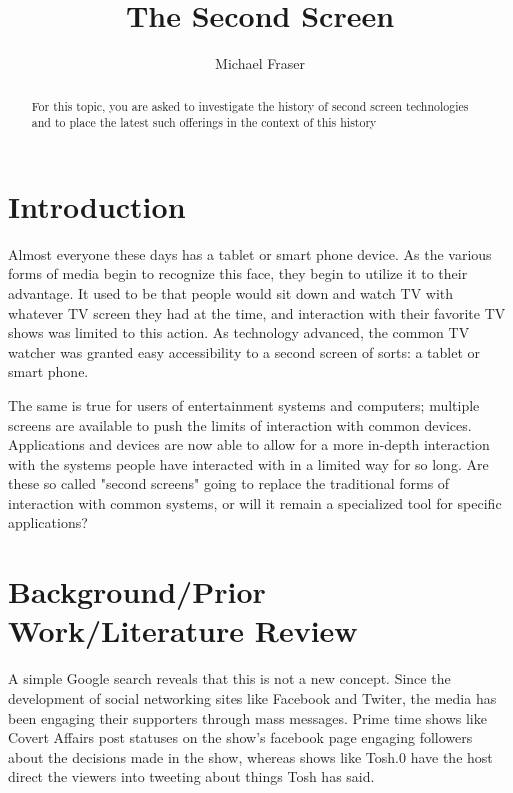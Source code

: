 \documentclass[11pt, oneside]{article}
\begin{document}
\title{The Second Screen}
\author{Michael Fraser}
\maketitle

\begin{abstract}
For this topic, 
you are asked to investigate the history of second 
screen technologies and to place the latest such 
offerings in the context of this history
\end{abstract}

\tableofcontents

\section{Introduction}
Almost everyone these days has a tablet or smart phone device. As the various forms of media begin to recognize this face, they begin to utilize it to their advantage. It used to be that people would sit down and watch TV with whatever TV screen they had at the time, and interaction with their favorite TV shows was limited to this action. As technology advanced, the common TV watcher was granted easy accessibility to a second screen of sorts: a tablet or smart phone. 

The same is true for users of entertainment systems and computers; multiple screens are available to push the limits of interaction with common devices. Applications and devices are now able to allow for a more in-depth interaction with the systems people have interacted with in a limited way for so long. Are these so called "second screens" going to replace the traditional forms of interaction with common systems, or will it remain a specialized tool for specific applications?


\section{Background/Prior Work/Literature Review}
A simple Google search reveals that this is not a new concept. Since the development of social networking sites like Facebook and Twiter, the media has been engaging their supporters through mass messages. Prime time shows like Covert Affairs post statuses on the show's facebook page engaging followers about the decisions made in the show, whereas shows like Tosh.0 have the host direct the viewers into tweeting about things Tosh has said. 
\end{document}
